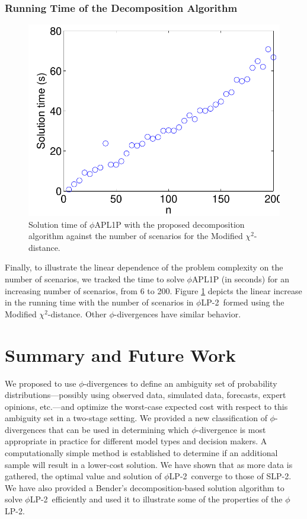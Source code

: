 \documentclass[opre,nonblindrev]{informs3} %
\newcommand{\plp}{$\phi$LP-2}
\begin{document}
\subsubsection{Running Time of the Decomposition Algorithm}
\label{ssec:run_time}

\begin{figure}[h]
	\FIGURE
	{%
		\includegraphics*[width=.40\textwidth]{images/runtime}
	}
	{
		Solution time of $\phi$APL1P with the proposed decomposition algorithm against the number of scenarios for the Modified $\chi^2$-distance.
		\label{fig:runtime}
	}
	{}
\end{figure}

Finally, to illustrate the linear dependence of the problem complexity on the number of scenarios, we tracked the time to solve $\phi$APL1P (in seconds) for an increasing number of scenarios, from 6 to 200. 
Figure \ref{fig:runtime} depicts the linear increase in the running time with the number of scenarios in \plp\ formed using the Modified $\chi^2$-distance. 
Other $\phi$-divergences have similar behavior. 

\section{Summary and Future Work}
\label{sec:plp_conclusions}

We proposed to use $\phi$-divergences
to define an ambiguity set of probability distributions---possibly using observed data, simulated data, forecasts, expert opinions, etc.---and optimize the worst-case expected cost with respect to this ambiguity set in a two-stage setting.
We provided a new classification of $\phi$-divergences that can be used in determining which $\phi$-divergence is most appropriate in practice for different model types and decision makers.
A computationally simple method is established to determine if an additional sample %
will result in a lower-cost solution.
We have shown that as more data is gathered, the optimal value and solution of \plp\ converge to those of SLP-2. 
We have also provided a Bender's decomposition-based solution algorithm to solve \plp\ efficiently and used it to illustrate some of the properties of the \plp.
\end{document}
